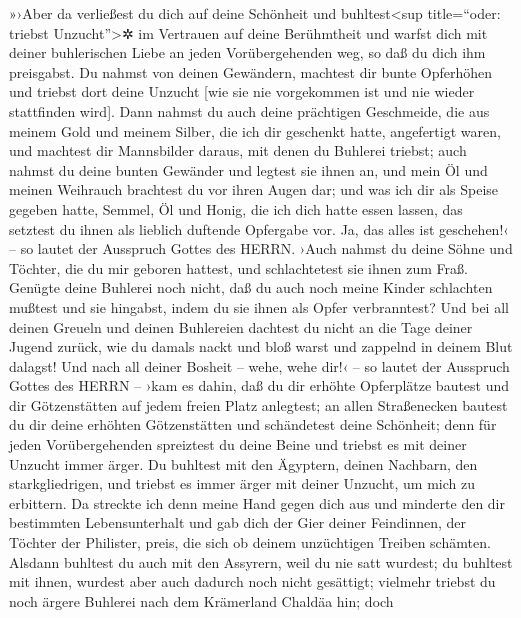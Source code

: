 »›Aber da verließest du dich auf deine Schönheit und
buhltest\textless sup title=``oder: triebst Unzucht''\textgreater✲ im
Vertrauen auf deine Berühmtheit und warfst dich mit deiner buhlerischen
Liebe an jeden Vorübergehenden weg, so daß du dich ihm preisgabst.
Du nahmst von deinen Gewändern, machtest dir bunte
Opferhöhen und triebst dort deine Unzucht {[}wie sie nie vorgekommen ist
und nie wieder stattfinden wird{]}. Dann nahmst du auch
deine prächtigen Geschmeide, die aus meinem Gold und meinem Silber, die
ich dir geschenkt hatte, angefertigt waren, und machtest dir Mannsbilder
daraus, mit denen du Buhlerei triebst; auch nahmst du
deine bunten Gewänder und legtest sie ihnen an, und mein Öl und meinen
Weihrauch brachtest du vor ihren Augen dar; und was ich
dir als Speise gegeben hatte, Semmel, Öl und Honig, die ich dich hatte
essen lassen, das setztest du ihnen als lieblich duftende Opfergabe vor.
Ja, das alles ist geschehen!‹ -- so lautet der Ausspruch Gottes des
HERRN. ›Auch nahmst du deine Söhne und Töchter, die du
mir geboren hattest, und schlachtetest sie ihnen zum Fraß. Genügte deine
Buhlerei noch nicht, daß du auch noch meine Kinder
schlachten mußtest und sie hingabst, indem du sie ihnen als Opfer
verbranntest? Und bei all deinen Greueln und deinen
Buhlereien dachtest du nicht an die Tage deiner Jugend zurück, wie du
damals nackt und bloß warst und zappelnd in deinem Blut dalagst!
Und nach all deiner Bosheit -- wehe, wehe dir!‹ -- so
lautet der Ausspruch Gottes des HERRN -- ›kam es dahin,
daß du dir erhöhte Opferplätze bautest und dir
Götzenstätten auf jedem freien Platz anlegtest; an allen
Straßenecken bautest du dir deine erhöhten Götzenstätten und schändetest
deine Schönheit; denn für jeden Vorübergehenden spreiztest du deine
Beine und triebst es mit deiner Unzucht immer ärger. Du
buhltest mit den Ägyptern, deinen Nachbarn, den starkgliedrigen, und
triebst es immer ärger mit deiner Unzucht, um mich zu erbittern.
Da streckte ich denn meine Hand gegen dich aus und
minderte den dir bestimmten Lebensunterhalt und gab dich der Gier deiner
Feindinnen, der Töchter der Philister, preis, die sich ob deinem
unzüchtigen Treiben schämten. Alsdann buhltest du auch
mit den Assyrern, weil du nie satt wurdest; du buhltest mit ihnen,
wurdest aber auch dadurch noch nicht gesättigt; vielmehr
triebst du noch ärgere Buhlerei nach dem Krämerland Chaldäa hin; doch
